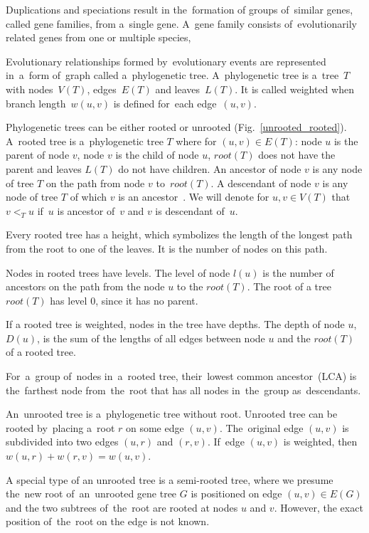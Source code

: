 Duplications and speciations result in the~formation of groups of~similar genes, called gene families, from a~single gene. A~gene family consists of~evolutionarily related genes from one or multiple species, 

Evolutionary relationships formed by~evolutionary events are represented in~a~form of~graph called a~phylogenetic tree. A~phylogenetic tree is a~tree~$T$ with nodes~$V(T)$, edges~$E(T)$ and leaves~$L(T)$. It is called weighted when branch length~$w(u, v)$ is defined for~each edge~$(u, v)$.

Phylogenetic trees can be either rooted or unrooted (Fig.~\ref{unrooted_rooted}). A~rooted tree is a~phylogenetic tree $T$ where for $(u, v) \in E(T)$: node $u$ is the parent of node $v$, node $v$ is the child of node $u$, $root(T)$ does not have the parent and leaves $L(T)$ do not have children. An ancestor of node $v$ is any node of tree $T$ on the path from node $v$ to~$root(T)$. A descendant of node $v$ is any node of tree $T$ of which $v$ is an ancestor~\cite{hasic}. We will denote for $u, v \in V(T)$ that $v<_Tu$ if~$u$ is ancestor of~$v$ and $v$ is descendant of~$u$.

Every rooted tree has a height, which symbolizes the length of the longest path from the root to one of the leaves. It is the number of nodes on this path. 

Nodes in rooted trees have levels. The level of node $l(u)$ is the number of ancestors on the path from the node $u$ to the $root(T)$. The root of a tree $root(T)$ has level 0, since it has no parent.

If a rooted tree is weighted, nodes in the tree have depths. The depth of node $u$, $D(u)$, is the sum of the lengths of all edges between node $u$ and the $root(T)$ of a rooted tree.

For~a~group of~nodes in~a~rooted tree, their~lowest common ancestor~(LCA) is the~farthest node from~the~root that has all nodes in~the~group as~descendants.

An~unrooted tree is a~phylogenetic tree without root. Unrooted tree can be rooted by~placing a~root $r$ on some edge $(u, v)$. The~original edge $(u, v)$ is subdivided into two edges $(u, r)$ and $(r, v)$. If~edge $(u, v)$ is weighted, then $w(u, r) + w(r, v) = w(u, v)$.

A special type of an unrooted tree is a semi-rooted tree, where we presume the~new root of~an~unrooted gene tree $G$ is positioned on edge $(u, v) \in E(G)$ and the two subtrees of~the~root are rooted at nodes $u$ and $v$. However, the exact position of~the~root on the edge is not known.

